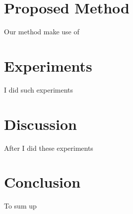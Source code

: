 \documentclass[letterpaper]{article}
\begin{document}
\section{Proposed Method}
Our method make use of

\section{Experiments}
I did such experiments

\section{Discussion}
After I did these experiments

\section{Conclusion}
To sum up



\end{document}
